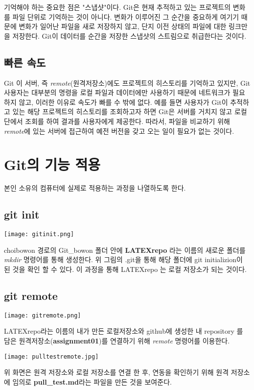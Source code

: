 \documentclass[11pt]{article}
\begin{document}
	기억해야 하는 중요한 점은 "스냅샷"이다. Git은 현재 추적하고 있는 프로젝트의 변화를 파일 단위로 기억하는 것이 아니다. 변화가 이루어진 그 순간을 중요하게 여기기 때문에 변화가 일어난 파일을 새로 저장하지 않고, 단지 이전 상태의 파일에 대한 링크만을 저장한다. Git이 데이터를 순간을 저장한 스냅샷의 스트림으로 취급한다는 것이다. 

	\subsection{빠른 속도}

	Git 이 서버, 즉 \textit{remote}(원격저장소)에도 프로젝트의 히스토리를 기억하고 있지만, Git 사용자는 대부분의 명령을 로컬 파일과 데이터에만 사용하기 때문에 네트워크가 필요 하지 않고, 이러한 이유로 속도가 빠를 수 밖에 없다. 예를 들면 사용자가 Git이 추적하고 있는 해당 프로젝트의 히스토리를 조회하고자 하면 Git은 서버를 거치지 않고 로컬단에서 조회를 하여 결과를 사용자에게 제공한다. 따라서, 파일을 비교하기 위해 \textit{remote}에 있는 서버에 접근하여 예전 버전을 갖고 오는 일이 필요가 없는 것이다. 

\newpage
\section{Git의 기능 적용}
	본인 소유의 컴퓨터에 실제로 적용하는 과정을 나열하도록 한다. 
	\subsection{git init}
	\begin{center}\texttt{[image: gitinit.png]}\end{center}
	choibowon 경로의 Git\_bowon 폴더 안에 \textbf{LATEXrepo} 라는 이름의 새로운 폴더를 \textit{mkdir} 명령어를 통해 생성한다. 위 그림의 .git을 통해 해당 폴더에 git initializion이 된 것을 확인 할 수 있다. 이 과정을 통해 LATEXrepo 는 로컬 저장소가 되는 것이다.
	
	\subsection{git remote}
	\begin{center}\texttt{[image: gitremote.png]}\end{center}
	LATEXrepo라는 이름의 내가 만든 로컬저장소와 github에 생성한 내 repository 를 담은 원격저장소(\textbf{assignment01})를 연결하기 위해 \textit{remote} 명령어를 이용한다.
	
	\begin{center}\texttt{[image: pulltestremote.jpg]}\end{center}
	위 화면은 원격 저장소와 로컬 저장소를 연결 한 후, 연동을 확인하기 위해 원격 저장소에 임의로 \textbf{pull\_test.md}라는 파일을 만든 것을 보여준다.
	
\end{document}
